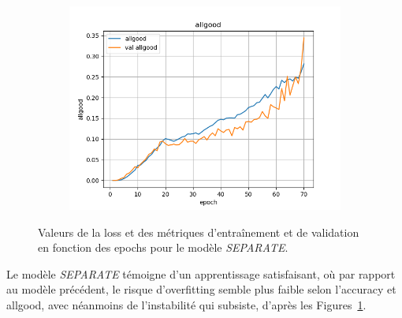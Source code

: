 \documentclass[a4paper]{article}
\begin{document}
\begin{figure}[H]
\begin{subfigure}{0.32\textwidth}
        \includegraphics[width=\linewidth]{../logs/separate/allgood.png}
    \end{subfigure}
    \caption{Valeurs de la loss et des métriques d'entraînement et de validation en fonction des epochs 
            pour le modèle \textit{SEPARATE}.}
    \label{fig: results separate}
\end{figure}

Le modèle \textit{SEPARATE} témoigne d'un apprentissage satisfaisant, où par rapport au modèle précédent, le risque d'overfitting 
semble plus faible selon l'accuracy et allgood, avec néanmoins de l'instabilité qui subsiste, d'après les 
Figures~\ref{fig: results separate}.
\end{document}
